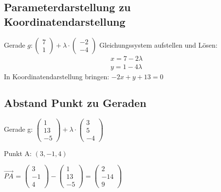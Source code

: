 \begin{multicols*}{3}
    \subsection{Parameterdarstellung zu Koordinatendarstellung}
    {Gerade $ g:  \begin{pmatrix}
                7 \\
                1
            \end{pmatrix} + \lambda \cdot \begin{pmatrix}
                -2 \\
                -4
            \end{pmatrix} $ }
    {Gleichungssystem aufstellen und Lösen:}
    \begin{gather*}
        x = 7 - 2 \lambda \\
        y = 1 - 4 \lambda
    \end{gather*}
    {In Koordinatendarstellung bringen:}
    $ -2x + y + 13 = 0$

    \subsection{Abstand Punkt zu Geraden}
    { Gerade g: $ \begin{pmatrix}
                1  \\
                13 \\
                -5
            \end{pmatrix} + \lambda \cdot
            \begin{pmatrix}
                3 \\
                5 \\
                -4
            \end{pmatrix} $}

    {Punkt A: $(3,-1,4)$}

    {$\overrightarrow{PA}$ = $\begin{pmatrix}
                3  \\
                -1 \\
                4
            \end{pmatrix} -  \begin{pmatrix}
                1  \\
                13 \\
                -5
            \end{pmatrix} =
            \begin{pmatrix}
                2   \\
                -14 \\
                9
            \end{pmatrix} $}


\end{multicols*}
